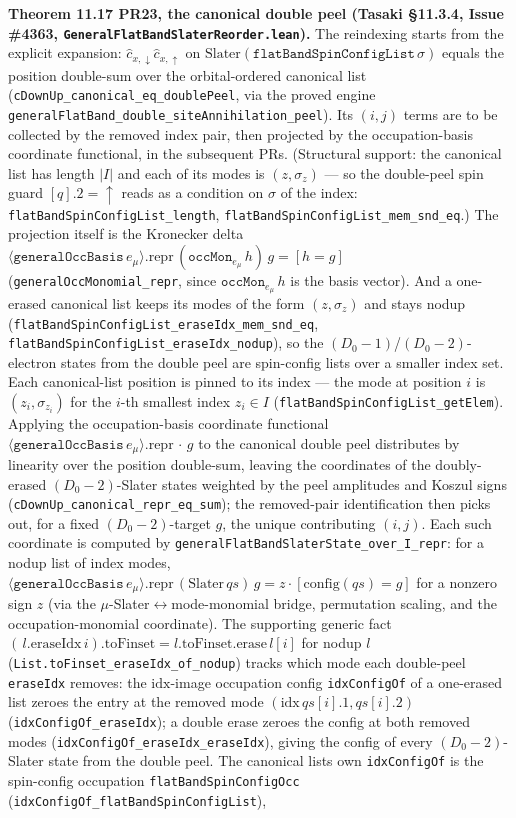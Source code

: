 \documentclass[a4paper,11pt]{article}
\begin{document}
\medskip\noindent\textbf{Theorem 11.17 PR23, the canonical double peel (Tasaki §11.3.4, Issue
\#4363, \texttt{GeneralFlatBandSlaterReorder.lean}).}  The reindexing starts from the explicit
expansion: $\hat c_{x,\downarrow}\hat c_{x,\uparrow}$ on $\text{Slater}(\texttt{flatBandSpinConfigList}\,
\sigma)$ equals the position double-sum over the orbital-ordered canonical list
(\texttt{cDownUp\_canonical\_eq\_doublePeel}, via the proved engine
\texttt{generalFlatBand\_double\_siteAnnihilation\_peel}).  Its $(i,j)$ terms are to be collected by
the removed index pair, then projected by the occupation-basis coordinate functional, in the
subsequent PRs.  (Structural support: the canonical list has length $|I|$ and each of its modes is
$(z,\sigma_z)$ --- so the double-peel spin guard $[q].2=\uparrow$ reads as a condition on $\sigma$
of the index: \texttt{flatBandSpinConfigList\_length}, \texttt{flatBandSpinConfigList\_mem\_snd\_eq}.)  The projection itself is the Kronecker delta $\langle\texttt{generalOccBasis}\,e_\mu\rangle.\mathrm{repr}\,(\texttt{occMon}_{e_\mu}\,h)\,g=[h=g]$ (\texttt{generalOccMonomial\_repr}, since $\texttt{occMon}_{e_\mu}\,h$ is the basis vector).  And a one-erased canonical list keeps its modes of the form $(z,\sigma_z)$ and stays nodup (\texttt{flatBandSpinConfigList\_eraseIdx\_mem\_snd\_eq}, \texttt{flatBandSpinConfigList\_eraseIdx\_nodup}), so the $(D_0{-}1)$/$(D_0{-}2)$-electron states from the double peel are spin-config lists over a smaller index set.  Each canonical-list position is pinned to its index --- the mode at position $i$ is $(z_i,\sigma_{z_i})$ for the $i$-th smallest index $z_i\in I$ (\texttt{flatBandSpinConfigList\_getElem}).  Applying the occupation-basis coordinate functional $\langle\texttt{generalOccBasis}\,e_\mu\rangle.\mathrm{repr}\,\cdot\,g$ to the canonical double peel distributes by linearity over the position double-sum, leaving the coordinates of the doubly-erased $(D_0{-}2)$-Slater states weighted by the peel amplitudes and Koszul signs (\texttt{cDownUp\_canonical\_repr\_eq\_sum}); the removed-pair identification then picks out, for a fixed $(D_0{-}2)$-target $g$, the unique contributing $(i,j)$.  Each such coordinate is computed by \texttt{generalFlatBandSlaterState\_over\_I\_repr}: for a nodup list of index modes, $\langle\texttt{generalOccBasis}\,e_\mu\rangle.\mathrm{repr}\,(\text{Slater}\,qs)\,g=z\cdot[\mathrm{config}(qs)=g]$ for a nonzero sign $z$ (via the $\mu$-Slater$\leftrightarrow$mode-monomial bridge, permutation scaling, and the occupation-monomial coordinate).  The supporting generic fact $(\,l.\mathrm{eraseIdx}\,i).\mathrm{toFinset}=l.\mathrm{toFinset}.\mathrm{erase}\,l[i]$ for nodup $l$ (\texttt{List.toFinset\_eraseIdx\_of\_nodup}) tracks which mode each double-peel \texttt{eraseIdx} removes: the $\mathrm{idx}$-image occupation config \texttt{idxConfigOf} of a one-erased list zeroes the entry at the removed mode $(\mathrm{idx}\,qs[i].1,qs[i].2)$ (\texttt{idxConfigOf\_eraseIdx}); a double erase zeroes the config at both removed modes (\texttt{idxConfigOf\_eraseIdx\_eraseIdx}), giving the config of every $(D_0{-}2)$-Slater state from the double peel.  The canonical list\textquotesingle s own \texttt{idxConfigOf} is the spin-config occupation \texttt{flatBandSpinConfigOcc} (\texttt{idxConfigOf\_flatBandSpinConfigList}), 
\end{document}
